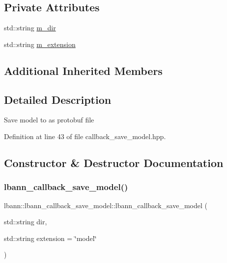 \subsection*{Private Attributes}
\begin{DoxyCompactItemize}
\item 
std\+::string \hyperlink{classlbann_1_1lbann__callback__save__model_aca89bd794b4a15b3beb89f3da464fbcd}{m\+\_\+dir}
\item 
std\+::string \hyperlink{classlbann_1_1lbann__callback__save__model_a76f51ce7ea7bbb1aff331102c87662bd}{m\+\_\+extension}
\end{DoxyCompactItemize}
\subsection*{Additional Inherited Members}


\subsection{Detailed Description}
Save model to as protobuf file 

Definition at line 43 of file callback\+\_\+save\+\_\+model.\+hpp.



\subsection{Constructor \& Destructor Documentation}
\mbox{\label{classlbann_1_1lbann__callback__save__model_a603d5e3c418ddc29724664eeff401707}} 
\subsubsection{\texorpdfstring{lbann\+\_\+callback\+\_\+save\+\_\+model()}{lbann\_callback\_save\_model()}\hspace{0.1cm}{\footnotesize\ttfamily [1/2]}}
{\footnotesize\ttfamily lbann\+::lbann\+\_\+callback\+\_\+save\+\_\+model\+::lbann\+\_\+callback\+\_\+save\+\_\+model (\begin{DoxyParamCaption}\item[{std\+::string}]{dir,  }\item[{std\+::string}]{extension = {\ttfamily \char`\"{}model\char`\"{}} }\end{DoxyParamCaption})\hspace{0.3cm}{\ttfamily [inline]}}


